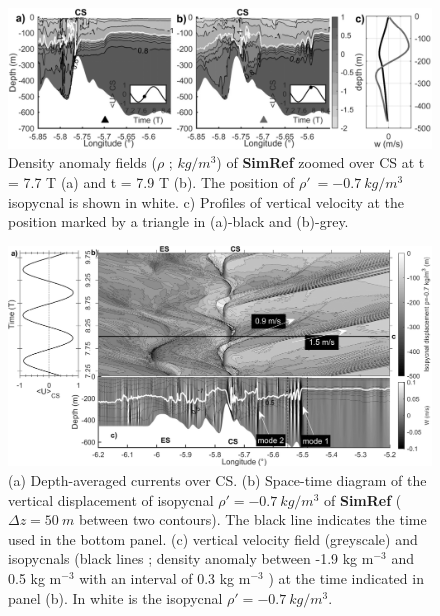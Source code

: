 \begin{figure}[!h]
\includegraphics[width=\textwidth]{./GBR2D/figure8.png}
  \caption{Density anomaly fields ($\rho$ ; $kg/m^3$) of \textbf{SimRef} zoomed over CS at t = 7.7 T (a) and t = 7.9 T (b). The position of $\rho'\ =-0.7\ kg/m^3$ isopycnal is shown in white. c) Profiles of vertical velocity at the position marked by a triangle in (a)-black and (b)-grey.}
  \label{fig_gen_CS}
  \end{figure}
  
\begin{figure}[!t]
\centering
\includegraphics[width=1\linewidth]{./GBR2D/figure9.png}
 \caption {(a) Depth-averaged currents over CS. (b) Space-time diagram of the vertical displacement of isopycnal $\rho' = -0.7\ kg/m^3$ of \textbf{SimRef} ($\Delta z = 50\ m$ between two contours). The black line indicates the time used in the bottom panel. (c) vertical velocity field (greyscale) and isopycnals (black lines ; density anomaly between -1.9 kg m$^{-3}$ and 0.5 kg m$^{-3}$ with an interval of 0.3 kg m$^{-3}$ ) at the time indicated in panel (b). In white is the isopycnal $\rho' = -0.7\ kg/m^3 $.}
 \label{hov_ref}
\end{figure}

